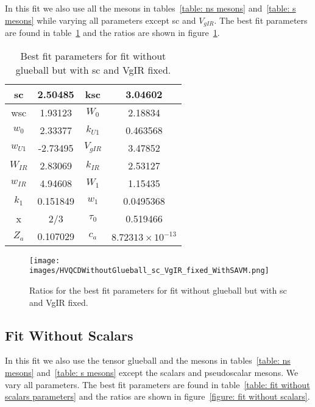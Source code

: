 \documentclass[10 pt]{article}
\begin{document}
In this fit we also use all the mesons in tables~\ref{table: ns mesons} and~\ref{table: s mesons} while varying all parameters except sc and $V_{gIR}$. The best fit parameters are found in table~\ref{table: fit without glueball sc VgIR fixed parameters} and the ratios are shown in figure~\ref{figure: fit without glueball sc VgIR fixed}.

\begin{table}
\centering
\begin{tabular}{ | c | c | c | c |}
\hline
sc & 2.50485 & ksc & 3.04602 \\
\hline
wsc & 1.93123 & $W_0$ & 2.18834 \\
\hline
$w_0$ & 2.33377 & $k_{U1}$ & 0.463568 \\
\hline
$w_{U1}$ & -2.73495 & $V_{gIR}$ & 3.47852 \\
\hline
$W_{IR}$ & 2.83069 & $k_{IR}$ & 2.53127 \\
\hline
$w_{IR}$ & 4.94608 & $W_1$ & 1.15435\\
\hline
$k_1$ & 0.151849 & $w_1$ & 0.0495368\\
\hline
x & 2/3 & $\tau_0$ & 0.519466\\
\hline
$Z_a$ & 0.107029 & $c_a$ & $8.72313 \times 10^{-13}$\\
\hline
\end{tabular}
\caption{Best fit parameters for fit without glueball but with sc and VgIR fixed.}
\label{table: fit without glueball sc VgIR fixed parameters} 
\end{table}

\begin{figure}
  \center
  \texttt{[image: images/HVQCDWithoutGlueball\_sc\_VgIR\_fixed\_WithSAVM.png]} 
  \caption{Ratios for the best fit parameters for fit without glueball but with sc and VgIR fixed.}
  \label{figure: fit without glueball sc VgIR fixed}
\end{figure}


\subsection{Fit Without Scalars}

In this fit we also use the tensor glueball and the mesons in tables~\ref{table: ns mesons} and~\ref{table: s mesons} except the scalars and pseudoscalar mesons. We vary all parameters. The best fit parameters are found in table~\ref{table: fit without scalars parameters} and the ratios are shown in figure~\ref{figure: fit without scalars}.
\end{document}
